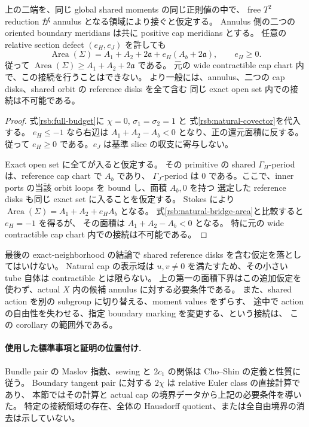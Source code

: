\begin{corollary}\label{rsb:natural-bridge}
上の二端を、同じ global shared moments の同じ正則値の中で、
free $T^2$ reduction が annulus となる領域により接ぐと仮定する。
Annulus 側の二つの oriented boundary meridians は共に positive cap meridians とする。
任意の relative section defect $(e_H,e_J)$ を許しても
\begin{equation}\label{rsb:natural-bridge-area}
 \operatorname{Area}(\Sigma)
 =A_1+A_2+2\mathfrak a+e_H(A_b+2\mathfrak a),\qquad e_H\ge0.
\end{equation}
従って $\operatorname{Area}(\Sigma)\ge A_1+A_2+2\mathfrak a$ である。
元の wide contractible cap chart 内で、この接続を行うことはできない。
より一般には、annulus、二つの cap disks、shared orbit の reference disks を全て含む
同じ exact open set 内での接続は不可能である。
\end{corollary}

\begin{proof}
式\eqref{rsb:full-budget}に $\chi=0$, $\sigma_1=\sigma_2=1$ と
式\eqref{rsb:natural-covector}を代入する。
$e_H\le-1$ なら右辺は $A_1+A_2-A_b<0$ となり、正の還元面積に反する。
従って $e_H\ge0$ である。$e_J$ は基準 slice の収支に寄与しない。

Exact open set に全てが入ると仮定する。
その primitive の shared $\Gamma_H$-period は、reference cap chart で $A_b$ であり、
$\Gamma_J$-period は $0$ である。ここで、inner ports の当該 orbit loops を bound し、面積 $A_b,0$ を持つ
選定した reference disks も同じ exact set に入ることを仮定する。
Stokes により $\operatorname{Area}(\Sigma)=A_1+A_2+e_H A_b$ となる。
式\eqref{rsb:natural-bridge-area}と比較すると $e_H=-1$ を得るが、
その面積は $A_1+A_2-A_b<0$ となる。
特に元の wide contractible cap chart 内での接続は不可能である。
\end{proof}

最後の exact-neighborhood の結論で shared reference disks を含む仮定を落としてはいけない。
Natural cap の表示域は $u,v\ne0$ を満たすため、その小さい tube 自体は contractible とは限らない。
上の第一の面積下界はこの追加仮定を使わず、actual $X$ 内の候補 annulus に対する必要条件である。
また、shared action を別の subgroup に切り替える、moment values をずらす、
途中で action の自由性を失わせる、指定 boundary marking を変更する、という接続は、
この corollary の範囲外である。

\paragraph{使用した標準事項と証明の位置付け.}
Bundle pair の Maslov 指数、sewing と $2c_1$ の関係は
Cho--Shin \cite[\S\S2--4]{cho-shin-maslov} の定義と性質に従う。
Boundary tangent pair に対する $2\chi$ は relative Euler class の直接計算であり、
本節ではその計算と actual cap の境界データから上記の必要条件を導いた。
特定の接続領域の存在、全体の Hausdorff quotient、または全自由境界の消去は示していない。
